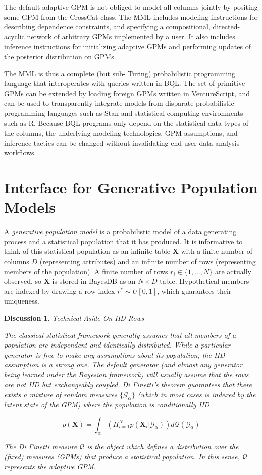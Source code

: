 \documentclass[10pt,letterpaper]{article}
\newtheorem{discussion}{Discussion}[section]
\newcommand{\set}[1]{\{#1\}}
\begin{document}
The default adaptive GPM is not obliged to model all columns jointly by
positing some GPM from the CrossCat class. The MML includes modeling
instructions for describing dependence constraints, and specifying a
compositional, directed-acyclic network of arbitrary GPMs implemented by a user.
It also includes inference instructions for initializing adaptive GPMs and
performing updates of the posterior distribution on GPMs.

The MML is thus a complete (but sub- Turing) probabilistic programming language
that interoperates with queries written in BQL. The set of primitive GPMs can be
extended by loading foreign GPMs written in VentureScript, and can be used to
transparently integrate models from disparate probabilistic programming
languages such as Stan and statistical computing environments such as R. Because
BQL programs only depend on the statistical data types of the columns, the
underlying modeling technologies, GPM assumptions, and inference tactics can be
changed without invalidating end-user data analysis workflows.

\section{Interface for Generative Population Models} \label{sec:generators}
A \textit{generative population model} is a probabilistic model of a data
generating process and a statistical population that it has produced. It is
informative to think of this statistical population as an infinite table
$\mathbf{X}$ with a finite number of columns $D$ (representing attributes) and
an infinite number of rows (representing members of the population). A finite
number of rows $r_i \in
\set{1,\dots,N}$ are actually observed, so $\mathbf{X}$ is stored in BayesDB as
an $N \times D$ table. Hypothetical members are indexed by drawing a row index
$r^*\sim U[0,1]$, which guarantees their uniqueness.

\begin{discussion} \label{disc:iid} Technical Aside On IID Rows

The classical statistical framework generally assumes that all members of a
population are independent and identically distributed. While a particular
generator is free to make any assumptions about its population, the IID
assumption is a strong one. The default generator (and almost any generator
being learned under the Bayesian framework) will usually assume that the rows
are not IID but exchangeably coupled. Di Finetti's theorem guarantees that there
exists a mixture of random measures $\set{\mathcal{G}_\alpha}$ (which in most
cases is indexed by the latent state of the GPM) where the population is
conditionally IID.

$$p(\mathbf{X}) = \int_\alpha{(\Pi_{i=1}^Np(\mathbf{X}_i|\mathcal{G}_\alpha))d
\mathcal{Q}(\mathcal{G}_\alpha)}$$

The Di Finetti measure $\mathcal{Q}$ is the object which defines a distribution
over the (fixed) measures (GPMs) that produce a statistical population. In this
sense, $\mathcal{Q}$ represents the adaptive GPM.

\end{discussion}
\end{document}

